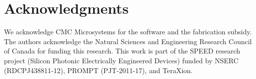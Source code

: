 \documentclass[letterpaper,10pt]{article}
\begin{document}
\section*{Acknowledgments}
We acknowledge CMC Microsystems for the  software and the fabrication subsidy. The authors acknowledge the Natural Sciences and Engineering Research Council of Canada for funding this research. This work is part of the SPEED research project (Silicon Photonic Electrically Engineered Devices) funded by NSERC (RDCPJ438811-12), PROMPT (PJT-2011-17), and TeraXion.



\end{document}
